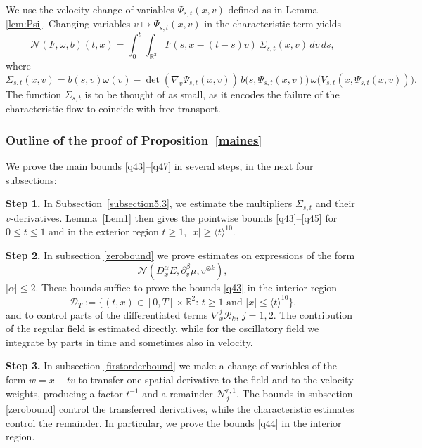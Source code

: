 \documentclass[reqno,11pt]{amsart}
\numberwithin{equation}{section}
\def\R{{\mathbb R}}
\def\R{{\bf R}}
\def\R{\mathbb{R}}
\begin{document}
	We use the velocity change of variables $\Psi_{s,t}(x,v)$ defined as in Lemma \ref{lem:Psi}.
	Changing variables $v\mapsto \Psi_{s,t}(x,v)$ in the characteristic term yields
	\begin{equation}\label{q1}
		\mathcal{N}(F,\omega,b)(t,x)=\int_0^t\!\!\int_{\mathbb{R}^2} F(s,x-(t-s)v)\,\Sigma_{s,t}(x,v)\,dv\,ds,
	\end{equation}
	where
	\begin{equation}\label{sec5eq7}
	\Sigma_{s,t}(x,v)=b(s,v)\omega(v)-\det(\nabla_v\Psi_{s,t}(x,v))\,b\big(s,\Psi_{s,t}(x,v)\big)\,\omega\big(V_{s,t}(x,\Psi_{s,t}(x,v))\big).
	\end{equation}
	The function $\Sigma_{s,t}$ is to be thought of as small, as it encodes the failure of the characteristic flow to coincide with free transport.
	
	\subsubsection{Outline of the proof of Proposition~\ref{maines}} We prove the main bounds \eqref{q43}--\eqref{q47} in several steps, in the next four subsections:
\smallskip

{\bf{Step 1.}} In Subsection~\ref{subsection5.3}, we estimate the multipliers
$\Sigma_{s,t}$ and their $v$-derivatives. Lemma~\ref{Lem1} then gives
the pointwise bounds \eqref{q43}--\eqref{q45} for $0\leq t\leq1$
and in the exterior region $t\geq1$, $|x|\geq\langle t\rangle^{10}$.
\smallskip


{\bf{Step 2.}} In subsection \ref{zerobound} we prove estimates on expressions of the form
\[
\mathcal N(D_x^\alpha E,\partial_v^\beta\mu,v^{\otimes k}),
\]
$|\alpha|\leq2$.  
These bounds suffice to prove the bounds \eqref{q43} in the interior region
\begin{equation}\label{sec5eq10}
\mathcal{D}_T:=\{(t,x)\in [0,T]\times\R^2:\,t\geq1\text{ and }|x|\leq\langle t\rangle^{10}\}.
\end{equation}
and to control parts of the differentiated terms $\nabla^j_x\mathcal{R}_k$, $j=1,2$. 
The contribution of the regular field is estimated directly, while for the oscillatory field we integrate by parts in time and sometimes also in velocity.
\smallskip

{\bf{Step 3.}} In subsection \ref{firstorderbound} we make a change of variables of the form $w=x-tv$ to transfer one spatial
derivative to the field and to the velocity weights, producing a factor
$t^{-1}$ and a remainder $\mathcal N_j^{r,1}$. The bounds in subsection \ref{zerobound} control the transferred derivatives, while the characteristic estimates control the remainder. In particular, we prove the bounds \eqref{q44} in the interior region.
\smallskip
\end{document}
